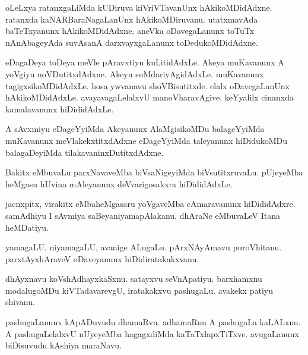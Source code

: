 \documentclass{article}
\begin{document}
\begin{mn}
oLeLxya  ratanxgaLiMda  kUDiruva  kiVriVTavanUnx  hAkikoMDidAdxne.  ratanxda  kaNARBaraNagaLanUnx  
hAkikoMDiruvanu.  utatxmavAda  baTeTxyanunx  hAkikoMDidAdxne.  aneVka  oDavegaLanunx  toTuTx  
nAnAbageyAda  suvAsanA  darxvayxgaLanunx  toDedukoMDidAdxne.
\end{mn}

\begin{mn}
eDagaDeya  toDeya  meVle  pAravxtiyu  kuLitidAdxLe.  Akeya  muKavanunx  A  yoVgiyu  noVDutitxdAdxne.  Akeyu  
suMdariyAgidAdxLe.  muKavanunx  tagigxsikoMDidAdxLe.  hosa  ywvanavu  shoVBisutitxde.  elalx  oDavegaLanUnx  
hAkikoMDidAdxLe.  avayavagaLelalxvU  manoVharavAgive.  keYyalilx  cinanxda  kamalavanunx  hiDididAdxLe.
\end{mn}

\begin{mn}
A  sAvxmiyu  eDageYyiMda  Akeyanunx  AlaMgisikoMDu  balageYyiMda  muKavanunx  meVlakekxtitxdAdxne  
eDageYyiMda  taleyanunx  hiDidukoMDu  balagaDeyiMda  tilakavaninxDutitxdAdxne.
\end{mn}

\begin{mn}
Bakitx  eMbuvaLu  parxNavaveMba  biVsaNigeyiMda  biVsutitxruvaLu.  pUjeyeMba  heMgasu  hUvina  
mAleyanunx  deVvarigosakxra  hiDididAdxLe.
\end{mn}

\begin{mn}
jacnxpitx,  virakitx  eMbaheMgasaru  yoVgaveMba  cAmaravanunx  hiDididAdxre.  samAdhiyu  I  
sAvmiya  saBeyaniyamapAlakanu.  dhAraNe  eMbuvaLeV  Itana  heMDatiyu.
\end{mn}

\begin{mn}
yamagaLU,  niyamagaLU,  avanige  ALugaLu.  pArxNAyAmavu  puroVhitanu.  parxtAyxhAraveV  oDaveyanunx  
hiDidiratakakxvanu.
\end{mn}

\begin{mn}
dhAyxnavu  koVshAdhayxkaSxnu.  satayxvu  seVnApatiyu.  barxhamxnu modalugoMDu  kiVTadavarevgU,  
iratakakxvu  pashugaLu.  avakekx  patiyu  shivanu.
\end{mn}

\begin{mn}
pashugaLanunx  kApADuvudu  dhamaRvu.  adhamaRnu  A  pashugaLa  kaLALxnu.  A  pashugaLelalxvU  
nUyeyeMba  hagagxdiMda  kaTaTxlapxTiTxve.  avugaLanunx  biDisuvudu  kAshiya  maraNavu.
\end{mn}
\end{document}
